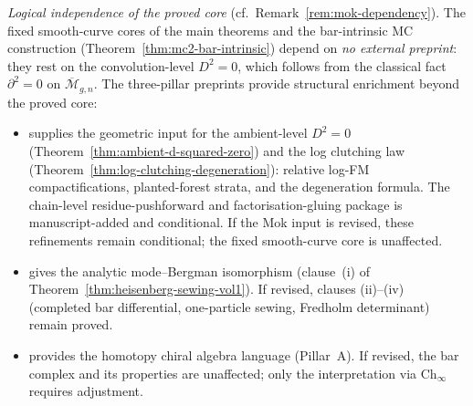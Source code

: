 \begin{remark}
\emph{Logical independence of the proved core}
(cf.\ Remark~\ref{rem:mok-dependency}).
The fixed smooth-curve cores of the main theorems and the bar-intrinsic
MC construction (Theorem~\ref{thm:mc2-bar-intrinsic}) depend on
\emph{no external preprint}: they rest on the convolution-level
$D^2 = 0$, which follows from the classical fact
$\partial^2 = 0$ on $\overline{\mathcal{M}}_{g,n}$.
The three-pillar preprints provide structural enrichment beyond
the proved core:
\begin{itemize}[nosep]
\item \cite{Mok25} supplies the geometric input for the ambient-level
 $D^2 = 0$ (Theorem~\ref{thm:ambient-d-squared-zero}) and the log
 clutching law (Theorem~\ref{thm:log-clutching-degeneration}): relative
 log-FM compactifications, planted-forest strata, and the degeneration
 formula. The chain-level residue-pushforward and factorisation-gluing
 package is manuscript-added and conditional. If the Mok input is
 revised, these refinements remain conditional; the fixed smooth-curve
 core is unaffected.
\item \cite{Moriwaki26b} gives the analytic mode--Bergman
 isomorphism (clause~(i) of
 Theorem~\ref{thm:heisenberg-sewing-vol1}). If revised, clauses
 (ii)--(iv) (completed bar differential, one-particle sewing,
 Fredholm determinant) remain proved.
\item \cite{MS24} provides the homotopy chiral algebra language
 (Pillar~A). If revised, the bar complex and its properties
 are unaffected; only the interpretation via $\mathrm{Ch}_\infty$
 requires adjustment.
\end{itemize}
\end{remark}

